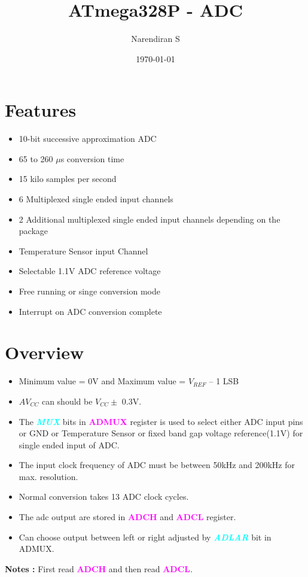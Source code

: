 \documentclass{article}
\title{ATmega328P - ADC}
\author{Narendiran S}
\date{\today}
\newcommand{\bitFormat}[1]{\emph{\textbf{\textcolor{cyan}{#1}}}}
\newcommand{\regFormat}[1]{\textbf{\textcolor{magenta}{#1}}}
\begin{document}
\maketitle

\section{Features}
\begin{itemize}
    \item 10-bit successive approximation ADC
    \item 65 to 260 $\mu$s conversion time
    \item 15 kilo samples per second
    \item 6 Multiplexed single ended input channels
    \item 2 Additional multiplexed single ended input channels depending on the package
    \item Temperature Sensor input Channel
    \item Selectable 1.1V ADC reference voltage
    \item Free running or singe conversion mode
    \item Interrupt on ADC conversion complete
\end{itemize}
\section{Overview}
\begin{itemize}
    \item Minimum value = 0V and Maximum value = $V_{REF}$ – 1 LSB
    \item $AV_{CC}$ can should be $V_{CC} \pm$ 0.3V.
    \item The \bitFormat{MUX} bits in \regFormat{ADMUX} register is used to select either ADC input pins or GND or Temperature Sensor or fixed band gap voltage reference(1.1V) for single ended input of ADC.
    \item The input clock frequency of ADC must be between 50kHz and 200kHz for max. resolution.
    \item Normal conversion takes 13 ADC clock cycles.
    \item The adc output are stored in \regFormat{ADCH} and \regFormat{ADCL} register.
    \item Can choose output between left or right adjusted by \bitFormat{ADLAR} bit in ADMUX.
\end{itemize}

\textbf{Notes :} First read \regFormat{ADCH} and then read \regFormat{ADCL}.
\end{document}
